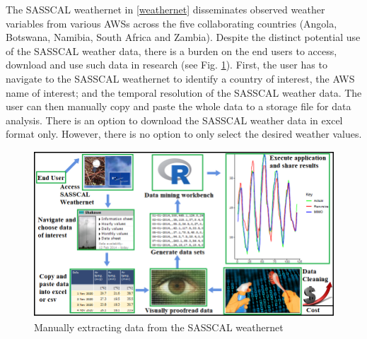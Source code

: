 \documentclass[a4paper, 10pt, conference]{ieeeconf}      %
\begin{document}
\noindent
	The SASSCAL weathernet  in \ref{weathernet} disseminates  observed weather variables from various AWSs across the five collaborating countries (Angola, Botswana, Namibia, South Africa and Zambia). 
	Despite the distinct potential use of the SASSCAL weather data, there is a burden on the end users to access, download and use such data in research (see Fig. \ref{datamunging}). %
	First, the user has to navigate to the SASSCAL weathernet to identify a country of interest, the    AWS name of interest; and the temporal resolution of the SASSCAL weather data. %
The user can then manually copy and paste the whole data to a storage file for data analysis. There is an option to download the SASSCAL weather data in excel format only. %
	However, there is no option to only select the desired weather values. 
	\begin{figure}[h]
   		\centering
   		\includegraphics[width=0.98\linewidth]{fig/MiPipe}
   		\caption{Manually extracting data  from the  SASSCAL weathernet}
   		\label{datamunging}
   	\end{figure}
   	
\end{document}
